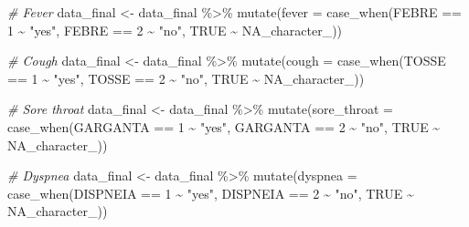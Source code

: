 \documentclass[
]{article}
\newenvironment{Shaded}{\begin{snugshade}}{\end{snugshade}}
\newcommand{\AttributeTok}[1]{\textcolor[rgb]{0.77,0.63,0.00}{#1}}
\newcommand{\CommentTok}[1]{\textcolor[rgb]{0.56,0.35,0.01}{\textit{#1}}}
\newcommand{\ConstantTok}[1]{\textcolor[rgb]{0.00,0.00,0.00}{#1}}
\newcommand{\DecValTok}[1]{\textcolor[rgb]{0.00,0.00,0.81}{#1}}
\newcommand{\FunctionTok}[1]{\textcolor[rgb]{0.00,0.00,0.00}{#1}}
\newcommand{\NormalTok}[1]{#1}
\newcommand{\OtherTok}[1]{\textcolor[rgb]{0.56,0.35,0.01}{#1}}
\newcommand{\SpecialCharTok}[1]{\textcolor[rgb]{0.00,0.00,0.00}{#1}}
\newcommand{\StringTok}[1]{\textcolor[rgb]{0.31,0.60,0.02}{#1}}
\begin{document}
\begin{Shaded}
\begin{Highlighting}[]
\CommentTok{\# Fever}
\NormalTok{data\_final }\OtherTok{\textless{}{-}}\NormalTok{  data\_final }\SpecialCharTok{\%\textgreater{}\%}
  \FunctionTok{mutate}\NormalTok{(}\AttributeTok{fever =} \FunctionTok{case\_when}\NormalTok{(FEBRE }\SpecialCharTok{==} \DecValTok{1} \SpecialCharTok{\textasciitilde{}} \StringTok{"yes"}\NormalTok{,}
\NormalTok{                           FEBRE }\SpecialCharTok{==} \DecValTok{2} \SpecialCharTok{\textasciitilde{}} \StringTok{"no"}\NormalTok{,}
                           \ConstantTok{TRUE} \SpecialCharTok{\textasciitilde{}} \ConstantTok{NA\_character\_}\NormalTok{))}

\CommentTok{\# Cough}
\NormalTok{data\_final }\OtherTok{\textless{}{-}}\NormalTok{  data\_final }\SpecialCharTok{\%\textgreater{}\%}
  \FunctionTok{mutate}\NormalTok{(}\AttributeTok{cough =} \FunctionTok{case\_when}\NormalTok{(TOSSE }\SpecialCharTok{==} \DecValTok{1} \SpecialCharTok{\textasciitilde{}} \StringTok{"yes"}\NormalTok{,}
\NormalTok{                           TOSSE }\SpecialCharTok{==} \DecValTok{2} \SpecialCharTok{\textasciitilde{}} \StringTok{"no"}\NormalTok{,}
                           \ConstantTok{TRUE} \SpecialCharTok{\textasciitilde{}} \ConstantTok{NA\_character\_}\NormalTok{))}

\CommentTok{\# Sore throat}
\NormalTok{data\_final }\OtherTok{\textless{}{-}}\NormalTok{  data\_final }\SpecialCharTok{\%\textgreater{}\%}
  \FunctionTok{mutate}\NormalTok{(}\AttributeTok{sore\_throat =} \FunctionTok{case\_when}\NormalTok{(GARGANTA }\SpecialCharTok{==} \DecValTok{1} \SpecialCharTok{\textasciitilde{}} \StringTok{"yes"}\NormalTok{,}
\NormalTok{                                 GARGANTA }\SpecialCharTok{==} \DecValTok{2} \SpecialCharTok{\textasciitilde{}} \StringTok{"no"}\NormalTok{,}
                                 \ConstantTok{TRUE} \SpecialCharTok{\textasciitilde{}} \ConstantTok{NA\_character\_}\NormalTok{))}

\CommentTok{\# Dyspnea}
\NormalTok{data\_final }\OtherTok{\textless{}{-}}\NormalTok{  data\_final }\SpecialCharTok{\%\textgreater{}\%}
  \FunctionTok{mutate}\NormalTok{(}\AttributeTok{dyspnea =} \FunctionTok{case\_when}\NormalTok{(DISPNEIA }\SpecialCharTok{==} \DecValTok{1} \SpecialCharTok{\textasciitilde{}} \StringTok{"yes"}\NormalTok{,}
\NormalTok{                             DISPNEIA }\SpecialCharTok{==} \DecValTok{2} \SpecialCharTok{\textasciitilde{}} \StringTok{"no"}\NormalTok{,}
                             \ConstantTok{TRUE} \SpecialCharTok{\textasciitilde{}} \ConstantTok{NA\_character\_}\NormalTok{))}


\end{Highlighting}
\end{Shaded}
\end{document}
